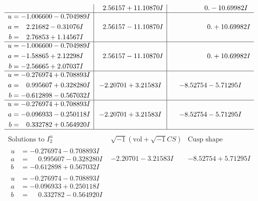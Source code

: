 \documentclass[1p]{elsarticle_modified}
\theoremstyle{definition}
\newcommand{\I}{\sqrt{-1}}
\begin{document}
$$\begin{array}{c|c|c}
 & \phantom{-}2.56157 + 11.10870 I & \phantom{-0.000000 } 0. - 10.69982 I \\ \hline\begin{aligned}
u &= -1.006600 - 0.704989 I \\
a &= \phantom{-}2.21682 - 0.31076 I \\
b &= \phantom{-}2.76853 + 1.14567 I\end{aligned}
 & \phantom{-}2.56157 - 11.10870 I & \phantom{-0.000000 -}0. + 10.69982 I \\ \hline\begin{aligned}
u &= -1.006600 - 0.704989 I \\
a &= -1.58865 + 2.12298 I \\
b &= -2.56665 + 2.07037 I\end{aligned}
 & \phantom{-}2.56157 - 11.10870 I & \phantom{-0.000000 -}0. + 10.69982 I \\ \hline\begin{aligned}
u &= -0.276974 + 0.708893 I \\
a &= \phantom{-}0.995607 + 0.328280 I \\
b &= -0.612898 - 0.567032 I\end{aligned}
 & -2.20701 + 3.21583 I & -8.52754 - 5.71295 I \\ \hline\begin{aligned}
u &= -0.276974 + 0.708893 I \\
a &= -0.096933 - 0.250118 I \\
b &= \phantom{-}0.332782 + 0.564920 I\end{aligned}
 & -2.20701 + 3.21583 I & -8.52754 - 5.71295 I\\
 \hline 
 \end{array}$$\newpage$$\begin{array}{c|c|c}  
\text{Solutions to }I^u_{2}& \I (\text{vol} + \sqrt{-1}CS) & \text{Cusp shape}\\
 \hline 
\begin{aligned}
u &= -0.276974 - 0.708893 I \\
a &= \phantom{-}0.995607 - 0.328280 I \\
b &= -0.612898 + 0.567032 I\end{aligned}
 & -2.20701 - 3.21583 I & -8.52754 + 5.71295 I \\ \hline\begin{aligned}
u &= -0.276974 - 0.708893 I \\
a &= -0.096933 + 0.250118 I \\
b &= \phantom{-}0.332782 - 0.564920 I\end{aligned}

\end{array}$$
\end{document}
